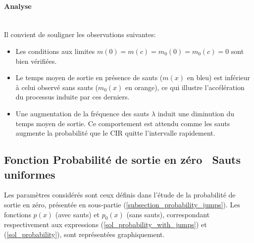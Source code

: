 \FloatBarrier\paragraph{Analyse}\phantom{}\\
Il convient de souligner les observations suivantes:
\begin{itemize}
    \item Les conditions aux limites \( m(0) = m(c) = m_0(0) = m_0(c) = 0 \) sont bien vérifiées.
    \item Le temps moyen de sortie en présence de sauts ($m(x)$ en bleu) est inférieur à celui observé sans sauts ($m_0(x)$ en orange), ce qui illustre l'accélération du processus induite par ces derniers.
    \item Une augmentation de la fréquence des sauts $\lambda$ induit une diminution du temps moyen de sortie. Ce comportement est attendu comme les sauts augmente la probabilité que le \acs{CIR} quitte l'intervalle rapidement.
\end{itemize}

\subsection{Fonction Probabilité de sortie en zéro \textemdash~Sauts uniformes}
Les paramètres considérés sont ceux définis dans l'étude de la probabilité de sortie en zéro, présentée en sous-partie (\ref{subsection_probability_jumps}). Les fonctions \( p(x) \) (avec sauts) et \( p_0(x) \) (sans sauts), correspondant respectivement aux expressions (\ref{sol_probability_with_jumps}) et (\ref{sol_probability}), sont représentées graphiquement.
